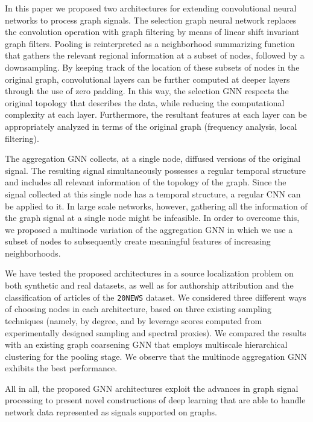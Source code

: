 

In this paper we proposed two architectures for extending convolutional neural networks to process graph signals. The selection graph neural network replaces the convolution operation with graph filtering by means of linear shift invariant graph filters. Pooling is reinterpreted as a neighborhood summarizing function that gathers the relevant regional information at a subset of nodes, followed by a downsampling. By keeping track of the location of these subsets of nodes in the original graph, convolutional layers can be further computed at deeper layers through the use of zero padding. In this way, the selection GNN respects the original topology that describes the data, while reducing the computational complexity at each layer. Furthermore, the resultant features at each layer can be appropriately analyzed in terms of the original graph (frequency analysis, local filtering).

The aggregation GNN collects, at a single node, diffused versions of the original signal. The resulting signal simultaneously possesses a regular temporal structure and includes all relevant information of the topology of the graph. Since the signal collected at this single node has a temporal structure, a regular CNN can be applied to it. In large scale networks, however, gathering all the information of the graph signal at a single node might be infeasible. In order to overcome this, we proposed a multinode variation of the aggregation GNN in which we use a subset of nodes to subsequently create meaningful features of increasing neighborhoods.

We have tested the proposed architectures in a source localization problem on both synthetic and real datasets, as well as for authorship attribution and the classification of articles of the \texttt{20NEWS} dataset. We considered three different ways of choosing nodes in each architecture, based on three existing sampling techniques (namely, by degree, and by leverage scores computed from experimentally designed sampling and spectral proxies). We compared the results with an existing graph coarsening GNN that employs multiscale hierarchical clustering for the pooling stage. We observe that the multinode aggregation GNN exhibits the best performance.

All in all, the proposed GNN architectures exploit the advances in graph signal processing to present novel constructions of deep learning that are able to handle network data represented as signals supported on graphs.
